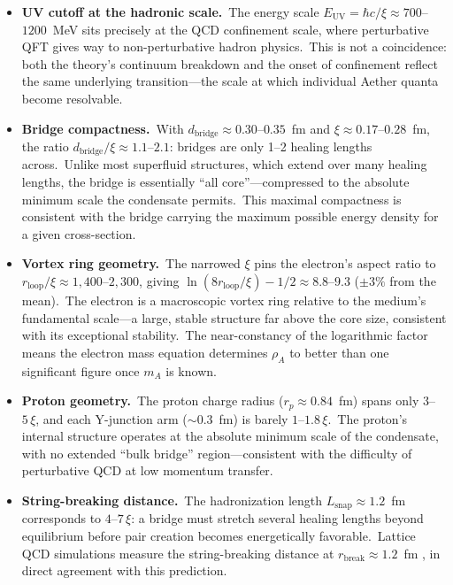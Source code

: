 ﻿\documentclass[12pt,letterpaper]{article}
\newcommand{\rhoa}{\rho_{\!A}}
\begin{document}
\begin{itemize}[leftmargin=2em]
  \item \textbf{UV cutoff at the hadronic scale.}\ The energy scale
    $E_{\mathrm{UV}} = \hbar c / \xi \approx 700$--$1200$~MeV sits precisely
    at the QCD confinement scale, where perturbative QFT gives way to
    non-perturbative hadron physics.\ This is not a coincidence: both the
    theory's continuum breakdown and the onset of confinement reflect the
    same underlying transition---the scale at which individual Aether quanta
    become resolvable.

  \item \textbf{Bridge compactness.}\ With $d_{\mathrm{bridge}} \approx
    0.30$--$0.35$~fm and $\xi \approx 0.17$--$0.28$~fm, the ratio
    $d_{\mathrm{bridge}}/\xi \approx 1.1$--$2.1$: bridges are only
    1--2 healing lengths across.\ Unlike most superfluid structures, which
    extend over many healing lengths, the bridge is essentially
    ``all core''---compressed to the absolute minimum scale the condensate
    permits.\ This maximal compactness is consistent with the bridge
    carrying the maximum possible energy density for a given cross-section.

  \item \textbf{Vortex ring geometry.}\ The narrowed $\xi$ pins the
    electron's aspect ratio to $r_{\mathrm{loop}}/\xi \approx
    1{,}400$--$2{,}300$, giving $\ln(8r_{\mathrm{loop}}/\xi) - 1/2 \approx
    8.8$--$9.3$ ($\pm 3\%$ from the mean).\ The electron is a macroscopic
    vortex ring relative to the medium's fundamental scale---a large, stable
    structure far above the core size, consistent with its exceptional
    stability.\ The near-constancy of the logarithmic factor means the
    electron mass equation determines $\rhoa$ to better than one significant
    figure once $m_A$ is known.

  \item \textbf{Proton geometry.}\ The proton charge radius
    ($r_p \approx 0.84$~fm) spans only $3$--$5\,\xi$, and each Y-junction
    arm ($\sim$0.3~fm) is barely $1$--$1.8\,\xi$.\ The proton's internal
    structure operates at the absolute minimum scale of the condensate, with
    no extended ``bulk bridge'' region---consistent with the difficulty of
    perturbative QCD at low momentum transfer.

  \item \textbf{String-breaking distance.}\ The hadronization length
    $L_{\mathrm{snap}} \approx 1.2$~fm corresponds to $4$--$7\,\xi$:
    a bridge must stretch several healing lengths beyond equilibrium
    before pair creation becomes energetically favorable.\ Lattice QCD
    simulations measure the string-breaking distance at
    $r_{\mathrm{break}} \approx 1.2$~fm \cite{bali2005,bulava2019},
    in direct agreement with this prediction.
\end{itemize}
\end{document}
